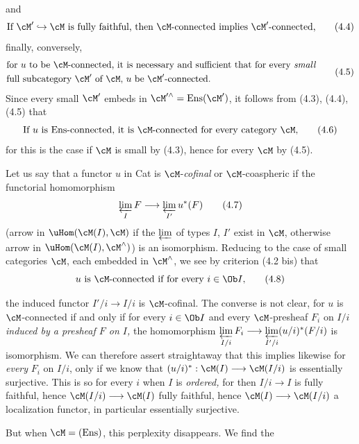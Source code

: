 and
\[
\text{If $\cM' \hookrightarrow \cM$ is fully faithful, then $\cM$-connected implies $\cM'$-connected,}
\tag*{(4.4)}
\]
finally, conversely,
\[
\begin{aligned}
&\text{for $u$ to be $\cM$-connected, it is necessary and sufficient that for every \textit{small}}\\
&\text{full subcategory $\cM'$ of $\cM$, $u$ be $\cM'$-connected.}
\end{aligned}
\tag*{(4.5)}
\]
Since every small $\cM'$ embeds in $\cM'^\wedge = \operatorname{Ens}(\cM')$, it follows from (4.3), (4.4), (4.5) that
\[
\text{If $u$ is Ens-connected, it is $\cM$-connected for every category $\cM$,}
\tag*{(4.6)}
\]
for this is the case if $\cM$ is small by (4.3), hence for every $\cM$ by (4.5).

Let us say that a functor $u$ in Cat is $\cM$-\textit{cofinal} or $\cM$-coaspheric if the functorial homomorphism
\[
\varprojlim_{I} F \longrightarrow \varprojlim_{I'} u^*(F)
\tag*{(4.7)}
\]
(arrow in $\uHom(\cM(I), \cM)$ if the $\varprojlim$ of types $I$, $I'$ exist in $\cM$, otherwise arrow in $\uHom(\cM(I), \cM^\wedge)$) is an isomorphism. Reducing to the case of small categories $\cM$, each embedded in $\cM^\wedge$, we see by criterion (4.2 bis) that
\[
\text{$u$ is $\cM$-connected if for every $i \in \Ob I$,}
\tag*{(4.8)}
\]

the induced functor $I'/i \longrightarrow I/i$ is $\cM$-cofinal. The converse is not clear, for $u$ is $\cM$-connected if and only if for every $i \in \Ob I$ and every $\cM$-presheaf $F_i$ on $I/i$ \textit{induced by a presheaf $F$ on $I$,} the homomorphism $\varprojlim\limits_{I/i} F_i \longrightarrow \varprojlim\limits_{I'/i} (u/i)^*(F/i)$ is isomorphism. We can therefore assert straightaway that this implies likewise for \textit{every} $F_i$ on $I/i$, only if we know that $(u/i)^* : \cM(I) \longrightarrow \cM(I/i)$ is essentially surjective. This is so for every $i$ when $I$ is \textit{ordered,} for then $I/i \longrightarrow I$ is fully faithful, hence $\cM(I/i) \longrightarrow \cM(I)$ fully faithful, hence $\cM(I) \longrightarrow \cM(I/i)$ a localization functor, in particular essentially surjective.

But when $\cM = (\text{Ens})$, this perplexity disappears. We find the

